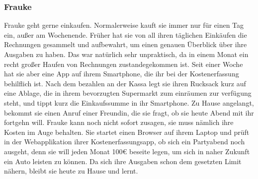 \subsubsection{Frauke}

Frauke geht gerne einkaufen. Normalerweise kauft sie immer nur für einen Tag ein, außer am Wochenende. Früher hat sie von all ihren täglichen Einkäufen die Rechnungen gesammelt und aufbewahrt, um einen genauen Überblick über ihre Ausgaben zu haben. Das war natürlich sehr unpraktisch, da in einem Monat ein recht großer Haufen von Rechnungen zustandegekommen ist. Seit einer Woche hat sie aber eine App auf ihrem Smartphone, die ihr bei der Kostenerfassung behilflich ist. Nach dem bezahlen an der Kassa legt sie ihren Rucksack kurz auf eine Ablage, die in ihrem bevorzugten Supermarkt zum einräumen zur verfügung steht, und tippt kurz die Einkaufssumme in ihr Smartphone. Zu Hause angelangt, bekommt sie einen Anruf einer Freundin, die sie fragt, ob sie heute Abend mit ihr fortgehn will. Frauke kann noch nicht sofort zusagen, sie muss nämlich ihre Kosten im Auge behalten. Sie startet einen Browser auf ihrem Laptop und prüft in der Webapplikation ihrer Kostenerfassungsapp, ob sich ein Partyabend noch ausgeht, denn sie will jeden Monat 100€ beseite legen, um sich in naher Zukunft ein Auto leisten zu können. Da sich ihre Ausgaben schon dem gesetzten Limit nähern, bleibt sie heute zu Hause und lernt.
